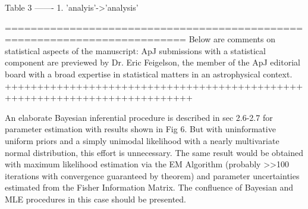 \documentclass[10pt,a4paper]{article}
\begin{document}
Table 3
-------
1. 'analyis'->'analysis'


==========================================================================
Below are comments on statistical aspects of the manuscript: ApJ submissions with a
statistical component are previewed by Dr. Eric Feigelson, the member of the ApJ
editorial board with a broad expertise in statistical matters in an astrophysical
context.
+++++++++++++++++++++++++++++++++++++++++++++++++++++++++++++++++++++++++++

An elaborate Bayesian inferential procedure is described in sec 2.6-2.7 for
parameter estimation with results shown in Fig 6. But with uninformative uniform
priors and a simply unimodal likelihood with a nearly multivariate normal
distribution, this effort is unnecessary. The same result would be obtained with
maximum likelihood estimation via the EM Algorithm (probably >>100 iterations with
convergence guaranteed by theorem) and parameter uncertainties estimated from the
Fisher Information Matrix. The confluence of Bayesian and MLE procedures in this
case should be presented.
\end{document}
